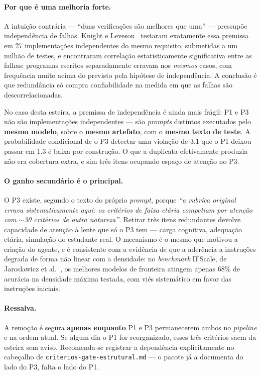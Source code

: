 \documentclass[11pt,a4paper]{article}
\newcommand{\cod}[1]{\texttt{\small #1}}
\begin{document}
\paragraph{Por que é uma melhoria forte.} A intuição contrária --- ``duas verificações são melhores que
uma'' --- pressupõe independência de falhas. Knight e Leveson~\cite{knight1986} testaram exatamente essa
premissa em 27 implementações independentes do mesmo requisito, submetidas a um milhão de testes, e
encontraram correlação estatisticamente significativa entre as falhas: programas escritos separadamente
erravam nos \textit{mesmos} casos, com frequência muito acima do previsto pela hipótese de independência.
A conclusão é que redundância só compra confiabilidade na medida em que as falhas são descorrelacionadas.

No caso desta esteira, a premissa de independência é ainda mais frágil: P1 e P3 não são implementações
independentes --- são \textit{prompts} distintos executados pelo \textbf{mesmo modelo}, sobre o
\textbf{mesmo artefato}, com o \textbf{mesmo texto de teste}. A probabilidade condicional de o P3 detectar
uma violação de 3.1 que o P1 deixou passar em 1.3 é baixa por construção. O que a duplicata efetivamente
produzia não era cobertura extra, e sim três itens ocupando espaço de atenção no P3.

\paragraph{O ganho secundário é o principal.} O P3 existe, segundo o texto do próprio \textit{prompt},
porque \textit{``a rubrica original errava sistematicamente aqui: os critérios de faixa etária competiam por
atenção com $\sim$30 critérios de outra natureza''}. Retirar três itens redundantes devolve capacidade de
atenção à lente que só o P3 tem --- carga cognitiva, adequação etária, simulação do estudante real. O
mecanismo é o mesmo que motivou a criação do agente, e é consistente com a evidência de que a aderência a
instruções degrada de forma não linear com a densidade: no \textit{benchmark} IFScale, de
Jaroslawicz et al.~\cite{ifscale2025}, os melhores modelos de fronteira atingem apenas 68\% de acurácia na
densidade máxima testada, com viés sistemático em favor das instruções iniciais.

\paragraph{Ressalva.} A remoção é segura \textbf{apenas enquanto} P1 e P3 permanecerem ambos no
\textit{pipeline} e na ordem atual. Se algum dia o P1 for reorganizado, esses três critérios saem da esteira
sem aviso. Recomenda-se registrar a dependência explicitamente no cabeçalho de
\cod{criterios-gate-estrutural.md} --- o pacote já a documenta do lado do P3, falta o lado do P1.
\end{document}
